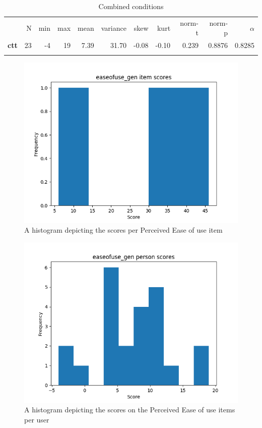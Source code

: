 \begin{longtable}[c]{@{}lrrrrrrrrrr@{}}
\caption{Combined conditions}
\endfirsthead
\toprule\addlinespace
& N & min & max & mean & variance & skew & kurt & norm-t &
norm-p & $\alpha$
\\\addlinespace
\midrule
\textbf{ctt} & 23 & -4 & 19 & 7.39 & 31.70 & -0.08 & -0.10 & 0.239 &
0.8876 & 0.8285
\\\addlinespace
\bottomrule
    \label{tab:easeofuse_gen}
\end{longtable}

\begin{figure}
    \includegraphics[width=\textwidth]{img/easeofuse_gen_diff.png}
    \caption{A histogram depicting the scores per Perceived Ease of use item}
    \label{fig:easeofuse_gen_diff}
\end{figure}
\begin{figure}
    \includegraphics[width=\textwidth]{img/easeofuse_gen_abil.png}
    \caption{A histogram depicting the scores on the Perceived Ease of use items per user}
    \label{fig:easeofuse_gen_abil}
\end{figure}

